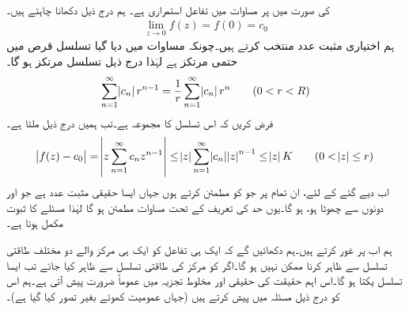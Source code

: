 \quad {}\\
 کی صورت میں  پر  مساوات  میں تفاعل   استمراری ہے۔
\quad
ہم درج ذیل دکھانا چاہتے ہیں۔
\begin{align}\label{مساوات_ٹیلر_طاقتی_تسلسل_اور_تحلیلی_تفاعل_ب}
\lim_{z\to 0} f(z)=f(0)=c_0
\end{align}
ہم اختیاری مثبت عدد  منتخب کرتے ہیں۔چونکہ مساوات  میں دیا گیا تسلسل  قرص  میں حتمی مرتکز ہے لہٰذا درج ذیل تسلسل مرتکز ہو گا۔
\begin{align*}
\sum\limits_{n=1}^{\infty}\abs{c_n}r^{n-1}=\frac{1}{r}\sum\limits_{n=1}^{\infty} \abs{c_n}r^n\quad \quad (0<r<R)
\end{align*}
فرض کریں کہ اس تسلسل کا مجموعہ  ہے۔تب ہمیں درج ذیل ملتا ہے۔
\begin{align*}
\abs{f(z)-c_0}=\abs{z\sum\limits_{n=1}^{\infty} c_n z^{n-1}}\le \abs{z}\sum\limits_{n=1}^{\infty}\abs{c_n}\abs{z}^{n-1}\le \abs{z}K\quad \quad (0<\abs{z}\le r)
\end{align*}
اب دیے گئے   کے لئے، ان تمام  پر جو  کو مطمئن کرتے ہوں جہاں  ایسا حقیقی مثبت عدد ہے جو  اور  دونوں سے چھوٹا ہو،   ہو گا۔یوں حد کی تعریف کے تحت مساوات  مطمئن ہو گا لہٰذا مسئلے کا ثبوت مکمل ہوتا ہے۔ 

ہم اب  پر غور کرتے ہیں۔ہم دکھائیں گے کہ ایک ہی تفاعل  کو ایک ہی مرکز والے دو مختلف طاقتی تسلسل سے ظاہر کرنا ممکن نہیں ہو گا۔اگر  کو مرکز  کی طاقتی تسلسل سے ظاہر کیا جائے تب ایسا تسلسل یکتا ہو گا۔اس اہم حقیقت کی حقیقی اور مخلوط تجزیہ میں عموماً ضرورت پیش آتی ہے۔ہم اس کو درج ذیل مسئلہ میں پیش کرتے ہیں (جہاں عمومیت کھوئے بغیر  تصور کیا گیا ہے)۔ 

